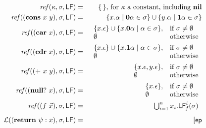\documentclass[9pt]{sigplanconf}
\def\myvec{\mathaccent"017E }
\begin{document}
\begin{figure*}[t]
\renewcommand{\arraystretch}{1.5}
\begin{eqnarray*}
\mathit{ref\/}(\kappa,\sigma,\Lfonly)
          &=& \{\,\} \mbox{, for $\kappa$ a constant, including
$\NIL$}\\
\mathit{ref\/}((\CONS~x~y),\sigma,\Lfonly)
          &=& \{x.\alpha \mid \acar\alpha \in \sigma\} \cup \{y.\alpha
\mid \acdr\alpha \in \sigma\} \\
\mathit{ref\/}((\CAR~x),\sigma,\Lfonly)
          &=&    \begin{array}{l l}
                    \{x.\epsilon\} \cup \{x.\acar\alpha \mid \alpha \in
\sigma\}, & \mbox{if}~\sigma \ne \emptyset\\
                    \emptyset  & \mbox{otherwise}
                 \end{array} \\
\mathit{ref\/}((\CDR~x),\sigma,\Lfonly)
          &=&    \begin{array}{l l}
                    \{x.\epsilon\} \cup \{x.\acdr\alpha \mid \alpha \in
\sigma\}, & \mbox{if}~\sigma \ne \emptyset\\
                    \emptyset  & \mbox{otherwise}
                 \end{array} \\
\mathit{ref\/}((\PRIM~x~y),\sigma,\Lfonly)
          &=&    \begin{array}{l l}
                    \{x.\epsilon, y.\epsilon\},  & \mbox{if}~\sigma \ne
\emptyset\\
                    \emptyset  & \mbox{otherwise}
                 \end{array} \\
\mathit{ref\/}((\NULLQ~x),\sigma,\Lfonly)
          &=&    \begin{array}{l l}
                    \{x.\epsilon\},  & \mbox{if}~\sigma \ne \emptyset\\
                    \emptyset  & \mbox{otherwise}
                 \end{array} \\
\mathit{ref\/}((f~\myvec{x}),\sigma,\Lfonly)
          &=&  \begin{array}{@{}l}  %
               \bigcup_{i=1}^n x_i.\Lf{f}{i}{\sigma}
               \end{array}
\\[1ex]
\mathcal{L}((\SRETURN~\psi:x),\sigma,\Lfonly) &=& \lbrack \mathit{\epath}

\end{eqnarray*}
\end{figure*}
\end{document}
